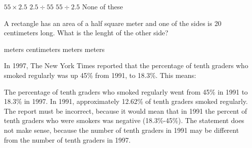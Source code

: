 \documentclass[10pt,answers]{exam}
\begin{document}
\begin{questions}
	\begin{oneparchoices}
	\choice 	$\displaystyle 55\times 2.5$
	\choice  $\displaystyle 2.5 \div 55$
	\CorrectChoice $\displaystyle 55 \div 2.5$
	\choice None of these
		\end{oneparchoices}
	
	\question A rectangle has an area of a half square meter and one of the sides is 20 centimeters long. What is the lenght of the other side?
	
	\begin{oneparchoices}
		 meters
		 centimeters
		 meters
		 meters
		
		\end{oneparchoices}

\question In 1997, The New York Times reported that the percentage of tenth graders who smoked regularly was up 45\% from 1991, to 18.3\%. This means: 


\begin{choices}
\choice The percentage of tenth graders who smoked regularly went from 45\% in 1991 to 18.3\% in 1997.
\CorrectChoice In 1991, approximately 12.62\% of tenth graders smoked regularly.
\choice The report must be incorrect, because it would mean that in 1991 the percent of tenth graders who were smokers was negative (18.3\%-45\%).
\choice The statement does not make sense, because the number of tenth graders in 1991 may be different from the number of tenth graders in 1997.
\end{choices}






\end{questions}
\end{document}
